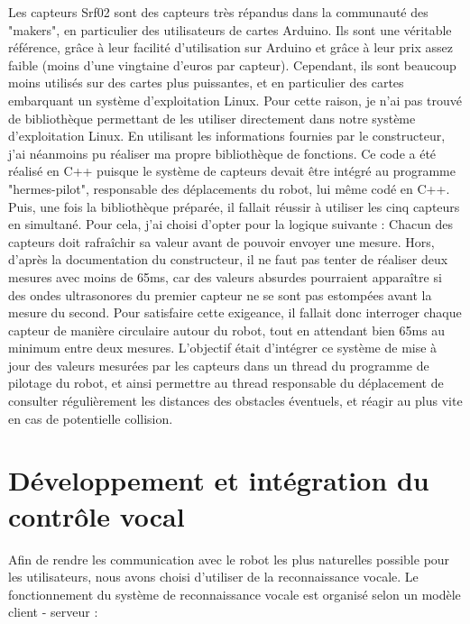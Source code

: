 \documentclass{report}
\begin{document}
        {Les capteurs Srf02 sont des capteurs très répandus dans la communauté des
        "makers", en particulier des utilisateurs de cartes Arduino. Ils sont
        une véritable référence, grâce à leur facilité d'utilisation sur Arduino et
        grâce à leur prix assez faible (moins d'une vingtaine d'euros par capteur).
        Cependant, ils sont beaucoup moins utilisés sur des cartes plus puissantes, et
        en particulier des cartes embarquant un système d'exploitation Linux. Pour
        cette raison, je n'ai pas trouvé de bibliothèque permettant de les utiliser
        directement dans notre système d'exploitation Linux. En utilisant les informations
        fournies par le constructeur, j'ai néanmoins pu réaliser ma propre bibliothèque
        de fonctions. Ce code a été réalisé en C++ puisque le système de capteurs devait être
        intégré au programme "hermes-pilot", responsable des déplacements du robot, lui même
        codé en C++.}
        {Puis, une fois la bibliothèque préparée, il fallait réussir à utiliser les cinq
        capteurs en simultané. Pour cela, j'ai choisi d'opter pour la logique suivante :\newline
        Chacun des capteurs doit rafraîchir sa valeur avant de pouvoir envoyer une
        mesure. Hors, d'après la documentation du constructeur, il ne faut pas tenter
        de réaliser deux mesures avec moins de 65ms, car des valeurs absurdes pourraient
        apparaître si des ondes ultrasonores du premier capteur ne se sont pas estompées
        avant la mesure du second. Pour satisfaire cette exigeance, il fallait donc
        interroger chaque capteur de manière circulaire autour du robot, tout en
        attendant bien 65ms au minimum entre deux mesures. L'objectif était d'intégrer
        ce système de mise à jour des valeurs mesurées par les capteurs dans un thread
        du programme de pilotage du robot, et ainsi permettre au thread responsable
        du déplacement de consulter régulièrement les distances des obstacles éventuels,
        et réagir au plus vite en cas de potentielle collision.
        }


    \section{Développement et intégration du contrôle vocal}

      {Afin de rendre les communication avec le robot les plus naturelles possible
      pour les utilisateurs, nous avons choisi d'utiliser de la reconnaissance vocale.
      Le fonctionnement du système de reconnaissance vocale est organisé selon
      un modèle client - serveur :}
\end{document}
